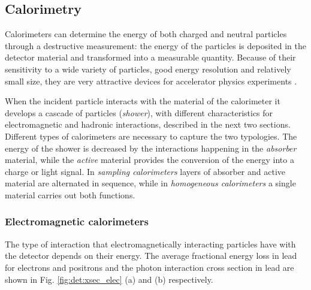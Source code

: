 \subsection{Calorimetry}
\label{sec:dec:calo}

Calorimeters can determine the energy of both charged and neutral particles through a destructive measurement: the energy of the particles is deposited in the detector material and transformed into a measurable quantity. Because of their sensitivity to a wide variety of particles, good energy resolution and relatively small size, they are very attractive devices for accelerator physics experiments \cite{RevModPhys.75.1243,Wigmans:2000vf}.

When the incident particle interacts with the material of the calorimeter it develops a cascade of particles (\textit{shower}), with different characteristics for electromagnetic and hadronic interactions, described in the next two sections. Different types of calorimeters are necessary to capture the two typologies. The energy of the shower is decreased by the interactions happening in the \textit{absorber} material, while the \textit{active} material provides the conversion of the energy into a charge or light signal. In \textit{sampling calorimeters} layers of absorber and active material are alternated in sequence, while in \textit{homogeneous calorimeters} a single material carries out both functions.


\subsubsection*{Electromagnetic calorimeters}

The type of interaction that electromagnetically interacting particles have with the detector depends on their energy. The average fractional energy loss in lead for electrons and positrons and the photon interaction cross section in lead are shown in Fig. \ref{fig:det:xsec_elec} (a) and (b) respectively. 

